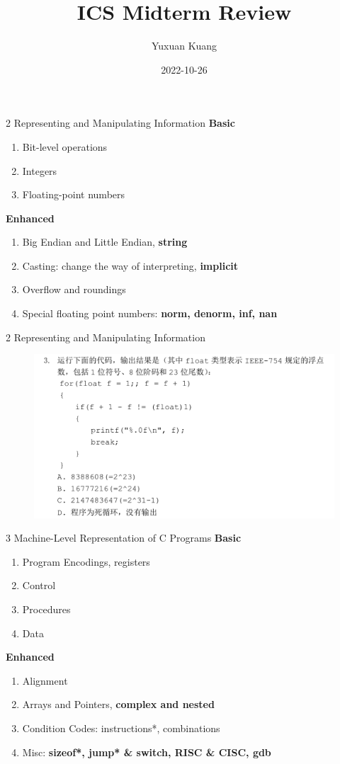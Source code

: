 \documentclass{beamer}
\title{\textbf{ICS Midterm Review}}
\author{Yuxuan Kuang}
\institute{School of EECS, PKU}
\date{2022-10-26}
\begin{document}
{ 
\frame{\titlepage}}

\begin{frame}{2 Representing and Manipulating Information}
\textbf{Basic}
\begin{enumerate}
	\item Bit-level operations
	\item Integers
	\item Floating-point numbers
\end{enumerate}
\textbf{Enhanced}
\begin{enumerate}
	\item Big Endian and Little Endian, \textbf{string} %
	\item Casting: change the way of interpreting, \textbf{implicit}
	\item Overflow and roundings
	\item Special floating point numbers: \textbf{norm, denorm, inf, nan}
\end{enumerate}
\end{frame}

\begin{frame}{2 Representing and Manipulating Information}
	\begin{figure}
		\centering
		\includegraphics[width=1.0\textwidth]{figures/2-1.jpeg}
	\end{figure}
\end{frame}


\begin{frame}{3 Machine-Level Representation of C Programs}
\textbf{Basic}
\begin{enumerate}
	\item Program Encodings, registers
	\item Control
	\item Procedures
	\item Data
\end{enumerate}
\textbf{Enhanced}
\begin{enumerate}
	\item Alignment
	\item Arrays and Pointers, \textbf{complex and nested}
	\item Condition Codes: instructions*, combinations
	\item Misc: \textbf{sizeof*, jump* \& switch, RISC \& CISC, gdb}
\end{enumerate}
\end{frame}
\end{document}
